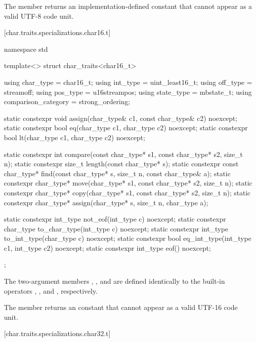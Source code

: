 \pnum
The member  returns an implementation-defined constant
that cannot appear as a valid UTF-8 code unit.

[char.traits.specializations.char16.t]{}

%
\begin{codeblock}
namespace std {
  template<> struct char_traits<char16_t> {
    using char_type  = char16_t;
    using int_type   = uint_least16_t;
    using off_type   = streamoff;
    using pos_type   = u16streampos;
    using state_type = mbstate_t;
    using comparison_category = strong_ordering;

    static constexpr void assign(char_type& c1, const char_type& c2) noexcept;
    static constexpr bool eq(char_type c1, char_type c2) noexcept;
    static constexpr bool lt(char_type c1, char_type c2) noexcept;

    static constexpr int compare(const char_type* s1, const char_type* s2, size_t n);
    static constexpr size_t length(const char_type* s);
    static constexpr const char_type* find(const char_type* s, size_t n,
                                           const char_type& a);
    static constexpr char_type* move(char_type* s1, const char_type* s2, size_t n);
    static constexpr char_type* copy(char_type* s1, const char_type* s2, size_t n);
    static constexpr char_type* assign(char_type* s, size_t n, char_type a);

    static constexpr int_type not_eof(int_type c) noexcept;
    static constexpr char_type to_char_type(int_type c) noexcept;
    static constexpr int_type to_int_type(char_type c) noexcept;
    static constexpr bool eq_int_type(int_type c1, int_type c2) noexcept;
    static constexpr int_type eof() noexcept;
  };
}
\end{codeblock}


\pnum
The two-argument members ,
, and  are defined identically to
the built-in operators \tcode{=}, \tcode{==}, and
\tcode{<}, respectively.

\pnum
The member  returns an
 constant that cannot appear
as a valid UTF-16 code unit.

[char.traits.specializations.char32.t]{}

